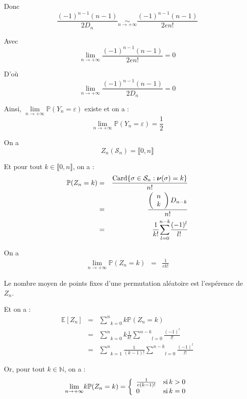 Donc
\[ \frac{(- 1)^{n - 1} (n - 1)}{2 D_n} \underset{n \rightarrow + \infty}{\sim}
   \frac{(- 1)^{n - 1} (n - 1)}{2 e n!} \]


Avec
\[ \underset{n \rightarrow + \infty}{\lim} \frac{(- 1)^{n - 1} (n - 1)}{2 e
   n!} = 0 \]


D'o{\`u}
\[ \underset{n \rightarrow + \infty}{\lim} \frac{(- 1)^{n - 1} (n - 1)}{2 D_n}
   = 0 \]


Ainsi, $\underset{n \rightarrow + \infty}{\lim} \mathbb{P} (Y_n =
\varepsilon)$ existe et on a :
\[ \underset{n \rightarrow + \infty}{\lim} \mathbb{P} (Y_n = \varepsilon) =
   \frac{1}{2} \]


 On a
\[ Z_n (\mathcal{S}_n) = \llbracket 0, n \rrbracket \]


Et pour tout $k \in \llbracket 0, n \rrbracket$, on a :
\begin{eqnarray*}
  \mathbb{P} (Z_n = k) & = & \frac{\operatorname{Card} \{ \sigma \in \mathcal{S}_n :
  \boldsymbol{\nu} (\sigma) = k \}}{n!}\\
  & = & \frac{\left( \begin{array}{c}
    n\\
    k
  \end{array} \right) D_{n - k}}{n!}\\
  & = & \frac{1}{k!} \underset{l = 0}{\overset{n - k}{\sum}} \frac{(-
  1)^l}{l!}
\end{eqnarray*}


 On a
\begin{eqnarray*}
  \underset{n \rightarrow + \infty}{\lim} \mathbb{P} (Z_n = k) & = &
  \frac{1}{e k!}
\end{eqnarray*}


 Le nombre moyen de points fixes d'une permutation
al{\'e}atoire est l'esp{\'e}rence de $Z_n$.

Et on a :
\begin{eqnarray*}
  \mathbb{E} [Z_n] & = & \underset{k = 0}{\overset{n}{\sum}} k\mathbb{P} (Z_n
  = k)\\
  & = & \underset{k = 0}{\overset{n}{\sum}} k \frac{1}{k!} \underset{l =
  0}{\overset{n - k}{\sum}} \frac{(- 1)^l}{l!}\\
  & = & \underset{k = 1}{\overset{n}{\sum}} \frac{1}{(k - 1) !} \underset{l =
  0}{\overset{n - k}{\sum}} \frac{(- 1)^l}{l!}
\end{eqnarray*}


Or, pour tout $k \in \mathbb{N}$, on a :
\[ \underset{n \rightarrow + \infty}{\lim} k\mathbb{P} (Z_n = k) =
   \left\{\begin{array}{ll}
     \frac{1}{e (k - 1) !} & \operatorname{si} k > 0\\
     0 & \operatorname{si} k = 0
   \end{array}\right. \]


